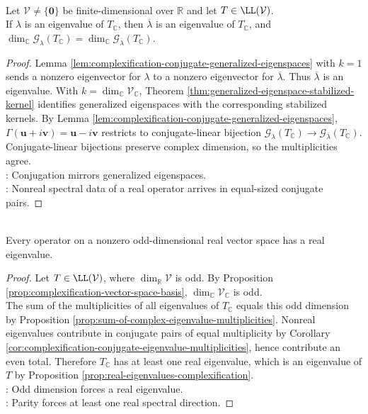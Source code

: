 \begin{corollary} \label{cor:complexification-conjugate-eigenvalue-multiplicities} \\
Let $\mathcal{V}\neq\{\mathbf{0}\}$ be finite-dimensional over $\mathbb{R}$ and let $T\in\LL(\mathcal{V})$.\\
If $\lambda$ is an eigenvalue of $T_{\mathbb{C}}$, then $\overline{\lambda}$ is an eigenvalue of $T_{\mathbb{C}}$, and $\dim_{\mathbb{C}}\mathcal{G}_{\lambda}(T_{\mathbb{C}}) =\dim_{\mathbb{C}}\mathcal{G}_{\overline{\lambda}}(T_{\mathbb{C}})$.
\begin{proof}
Lemma \ref{lem:complexification-conjugate-generalized-eigenspaces} with $k=1$ sends a nonzero eigenvector for $\lambda$ to a nonzero eigenvector for $\overline{\lambda}$. Thus $\overline{\lambda}$ is an eigenvalue. With $k=\dim_{\mathbb{C}}\mathcal{V}_{\mathbb{C}}$, Theorem \ref{thm:generalized-eigenspace-stabilized-kernel} identifies generalized eigenspaces with the corresponding stabilized kernels. By Lemma \ref{lem:complexification-conjugate-generalized-eigenspaces}, $\Gamma(\mathbf{u}+i\mathbf{v})=\mathbf{u}-i\mathbf{v}$ restricts to conjugate-linear bijection $\mathcal{G}_{\lambda}(T_{\mathbb{C}}) \longrightarrow \mathcal{G}_{\overline{\lambda}}(T_{\mathbb{C}})$.\\
Conjugate-linear bijections preserve complex dimension, so the multiplicities agree.\\
: Conjugation mirrors generalized eigenspaces.\\
: Nonreal spectral data of a real operator arrives in equal-sized conjugate pairs.
\end{proof}
\end{corollary}

\begin{corollary} \label{cor:odd-dimensional-real-operator-has-eigenvalue} \\
Every operator on a nonzero odd-dimensional real vector space has a real eigenvalue.
\begin{proof}
Let $T\in\LL(\mathcal{V})$, where $\dim_{\mathbb{R}}\mathcal{V}$ is odd. By Proposition \ref{prop:complexification-vector-space-basis}, $\dim_{\mathbb{C}}\mathcal{V}_{\mathbb{C}}$ is odd.\\
The sum of the multiplicities of all eigenvalues of $T_{\mathbb{C}}$ equals this odd dimension by Proposition \ref{prop:sum-of-complex-eigenvalue-multiplicities}. Nonreal eigenvalues contribute in conjugate pairs of equal multiplicity by Corollary \ref{cor:complexification-conjugate-eigenvalue-multiplicities}, hence contribute an even total. Therefore $T_{\mathbb{C}}$ has at least one real eigenvalue, which is an eigenvalue of $T$ by Proposition \ref{prop:real-eigenvalues-complexification}.\\
: Odd dimension forces a real eigenvalue.\\
: Parity forces at least one real spectral direction.
\end{proof}
\end{corollary}

